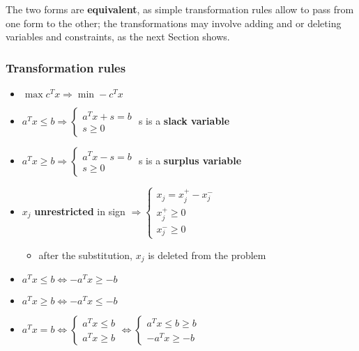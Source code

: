 \documentclass[english]{article}
\begin{document}
The two forms are \textbf{equivalent}, as simple transformation rules allow to pass from one form to the other;
the transformations may involve adding and or deleting variables and constraints, as the next Section shows.

\subsubsection{Transformation rules}

\begin{itemize}[parsep=1.25ex]
  \item \(\max c^T x \Rightarrow \min -c^T x\)
  \item \(a^T x \leq b \Rightarrow \begin{cases}
          a^T x + s = b \\
          s \geq 0
        \end{cases}\) s is a \textbf{slack variable}
  \item \(a^T x \geq b \Rightarrow \begin{cases}
          a^T x - s = b \\
          s \geq 0
        \end{cases}\) s is a \textbf{surplus variable}
  \item \(x_j\) \textbf{unrestricted} in sign \(\Rightarrow \begin{cases}
          x_j = x_j^+ - x_j^- \\
          x_j^+ \geq 0        \\
          x_j^- \geq 0
        \end{cases}\)
        \begin{itemize}[label=\(\rightarrow\)]
          \item after the substitution, \(x_j\) is deleted from the problem
        \end{itemize}
  \item \(a^T x \leq b \Leftrightarrow - a^T x \geq -b\)
  \item \(a^T x \geq b \Leftrightarrow - a^T x \leq -b\)
  \item \(a^T x = b \Leftrightarrow \begin{cases}
          a^T x \leq b \\
          a^T x \geq b
        \end{cases} \Leftrightarrow \begin{cases}
          a^T x \leq b \geq b \\
          -  a^T x \geq - b
        \end{cases}\)
\end{itemize}
\end{document}
